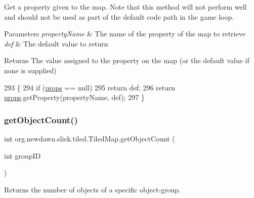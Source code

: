 Get a property given to the map. Note that this method will not perform well and should not be used as part of the default code path in the game loop.


\begin{DoxyParams}{Parameters}
{\em property\+Name} & The name of the property of the map to retrieve \\
\hline
{\em def} & The default value to return \\
\hline
\end{DoxyParams}
\begin{DoxyReturn}{Returns}
The value assigned to the property on the map (or the default value if none is supplied) 
\end{DoxyReturn}

\begin{DoxyCode}
293                                                                   \{
294         \textcolor{keywordflow}{if} (\mbox{\hyperlink{classorg_1_1newdawn_1_1slick_1_1tiled_1_1_tiled_map_ace934059dd995f4bda5f4c1534df9d30}{props}} == null)
295             \textcolor{keywordflow}{return} def;
296         \textcolor{keywordflow}{return} \mbox{\hyperlink{classorg_1_1newdawn_1_1slick_1_1tiled_1_1_tiled_map_ace934059dd995f4bda5f4c1534df9d30}{props}}.getProperty(propertyName, def);
297     \}
\end{DoxyCode}
\mbox{\label{classorg_1_1newdawn_1_1slick_1_1tiled_1_1_tiled_map_a445ccc51d54dfa01c589de1c957cce0c}} 
\subsubsection{\texorpdfstring{get\+Object\+Count()}{getObjectCount()}}
{\footnotesize\ttfamily int org.\+newdawn.\+slick.\+tiled.\+Tiled\+Map.\+get\+Object\+Count (\begin{DoxyParamCaption}\item[{int}]{group\+ID }\end{DoxyParamCaption})\hspace{0.3cm}{\ttfamily [inline]}}

Returns the number of objects of a specific object-\/group.


